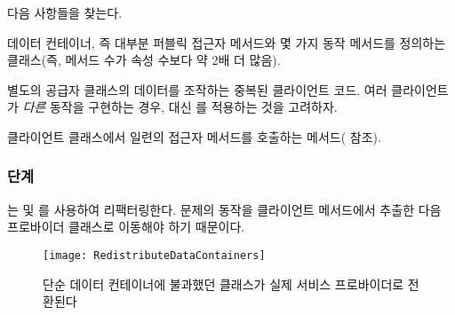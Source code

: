 \documentclass[a4paper,10pt,twoside]{book}
\begin{document}
다음 사항들을 찾는다.

\begin{bulletlist}
\item 데이터 컨테이너, 즉 대부분 퍼블릭 접근자 메서드와 몇 가지 동작 메서드를 정의하는 클래스(즉, 메서드 수가 속성 수보다 약 2배 더 많음).

\item 별도의 공급자 클래스의 데이터를 조작하는 중복된 클라이언트 코드. 여러 클라이언트가 \emph{다른} 동작을 구현하는 경우, 대신 를 적용하는 것을 고려하자.

\item 클라이언트 클래스에서 일련의 접근자 메서드를 호출하는 메서드( 참조).
\end{bulletlist}

\subsubsection*{단계}

는  및 를 사용하여 리팩터링한다. 문제의 동작을 클라이언트 메서드에서 추출한 다음 프로바이더 클래스로 이동해야 하기 때문이다.

\begin{figure}
\begin{center}
\texttt{[image: RedistributeDataContainers]}
\caption{단순 데이터 컨테이너에 불과했던 클래스가 실제 서비스 프로바이더로 전환된다}
\end{center}
\end{figure}
\end{document}
